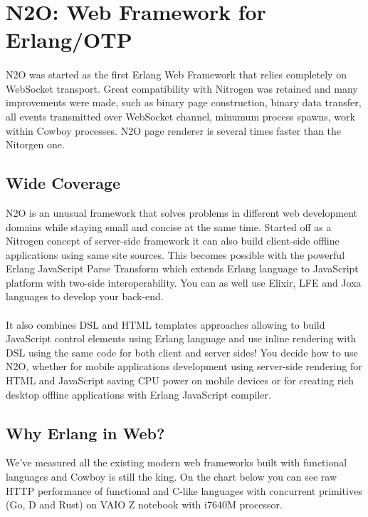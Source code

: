 \section{N2O: Web Framework for Erlang/OTP}

\paragraph{}
N2O was started as the first Erlang Web Framework
that relies completely on WebSocket transport. Great compatibility with Nitrogen
was retained and many improvements were made, such as binary page construction,
binary data transfer, all events transmitted over WebSocket channel, minumum process spawns,
work within Cowboy processes. N2O page renderer is several times faster
than the Nitorgen one.

\subsection{Wide Coverage}
N2O is an unusual framework that solves problems in different web development domains
while staying small and concise at the same time. Started off as a Nitrogen concept
of server-side framework it can also build client-side offline applications
using same site sources. This becomes possible with the powerful Erlang JavaScript Parse
Transform which extends Erlang language to JavaScript platform with two-side
interoperability. You can as well use Elixir, LFE and Joxa languages to develop
your back-end.

\paragraph{}
It also combines DSL and HTML templates approaches allowing to build JavaScript
control elements using Erlang language and use inline rendering with DSL using
the same code for both client and server sides!
You decide how to use N2O, whether for mobile applications development using server-side rendering
for HTML and JavaScript saving CPU power on mobile devices or for creating rich desktop
offline applications with Erlang JavaScript compiler.

\newpage
\subsection*{Why Erlang in Web?}
We've measured all the existing modern web frameworks built with functional
languages and Cowboy is still the king. On the chart below you can see raw HTTP
performance of functional and C-like languages with concurrent
primitives (Go, D and Rust) on VAIO Z notebook with i7640M processor.

